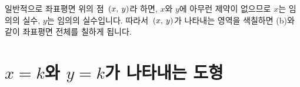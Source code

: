 일반적으로 좌표평면 위의 점 $\mathrm{}\left(x,\:y\right)$라 하면, $x$와 $y$에 아무런 제약이 없으므로 $x$는 임의의 실수, $y$는 임의의 실수입니다. 따라서 $\mathrm{}\left(x,\:y\right)$가 나타내는 영역을 색칠하면 (b)와 같이 좌표평면 전체를 칠하게 됩니다.

\section{$x=k$와 $y=k$가 나타내는 도형}

\begin{figure}[h]
	\centering {}\
	\qquad\qquad
	\centering {}\
	\end{figure}


